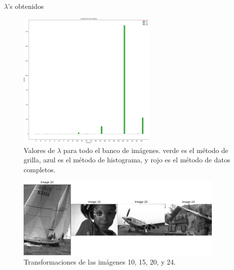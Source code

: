 \documentclass{beamer}
\begin{document}
\begin{frame}{$\lambda$'s obtenidos}
    \begin{figure}[H]
        \centering
        \includegraphics[width=0.6\textwidth]{lambda_noclip.png}
        \caption{Valores de $\lambda$ para todo el banco de im\'agenes. verde es el m\'etodo de grilla, azul es el m\'etodo de histograma, y rojo es el m\'etodo de datos completos.}
        \label{fig:lambda_noclip}
    \end{figure}

    \begin{figure}[H]
        \centering
        \includegraphics[width=0.9\textwidth]{img_ex_10_15_20_24.png}
        \caption{Transformaciones de las im\'agenes 10, 15, 20, y 24.}
        \label{fig:img_bci_10_15_20}
    \end{figure}

\end{frame}
\end{document}
